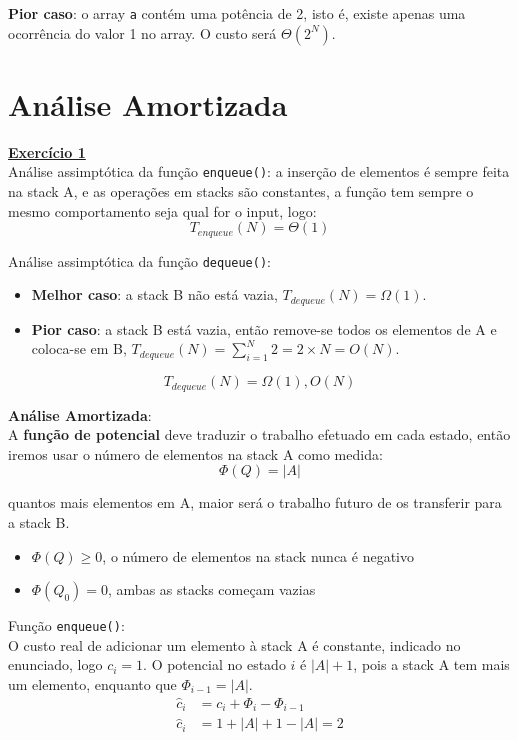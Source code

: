 \documentclass[a4paper,11pt]{article}
\begin{document}
	\noindent \textbf{Pior caso}: o array \texttt{a} contém uma potência de 2, isto é, existe apenas uma ocorrência do valor 1 no array. O custo será $\Theta(2^N)$.\\
	
	
	
	\section{Análise Amortizada}
	
	
	\noindent \underline{\textbf{Exercício 1}}\\
	
	\noindent Análise assimptótica da função \texttt{enqueue()}: a inserção de elementos é sempre feita na stack A, e as operações em stacks são constantes, a função tem sempre o mesmo comportamento seja qual for o input, logo:
	\[
		T_{enqueue}(N) = \Theta(1)
	\]
	
	\noindent Análise assimptótica da função \texttt{dequeue()}:
	\begin{itemize}
		\item \textbf{Melhor caso}: a stack B não está vazia, $ T_{dequeue}(N) = \Omega(1) $.
		\item \textbf{Pior caso}: a stack B está vazia, então remove-se todos os elementos de A e coloca-se em B, $ T_{dequeue}(N) = \sum_{i=1}^{N} 2 = 2 \times N = O(N) $.
	\end{itemize}
	\[
		T_{dequeue}(N) = \Omega(1), O(N)
	\]
	
	\noindent \textbf{Análise Amortizada}:\\
	
	\noindent A \textbf{função de potencial} deve traduzir o trabalho efetuado em cada estado, então iremos usar o número de elementos na stack A como medida:
	\[
		\Phi(Q) = |A|
	\]
	
	\noindent quantos mais elementos em A, maior será o trabalho futuro de os transferir para a stack B.
	\begin{itemize}
		\item $\Phi(Q) \geq 0$, o número de elementos na stack nunca é negativo
		\item $\Phi(Q_0) = 0$, ambas as stacks começam vazias
	\end{itemize}
	
	\noindent Função \texttt{enqueue()}:\\
	
	\noindent O custo real de adicionar um elemento à stack A é constante, indicado no enunciado, logo $c_i = 1$. O potencial no estado $i$ é $|A|+1$, pois a stack A tem mais um elemento, enquanto que $\Phi_{i-1} = |A|$.
	\begin{align*}
		\hat{c}_i & = c_i + \Phi_i - \Phi_{i-1} \\
		\hat{c}_i & = 1 + |A| + 1 - |A| = 2
	\end{align*}
	
\end{document}

